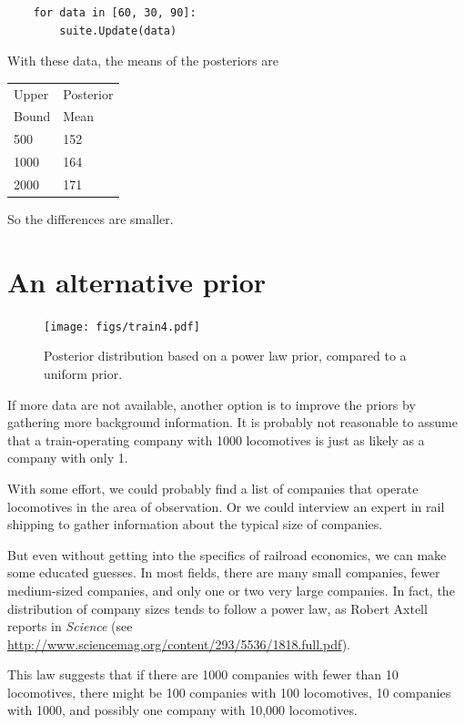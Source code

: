 \documentclass[12pt]{book}
\begin{document}
\begin{verbatim}
    for data in [60, 30, 90]:
        suite.Update(data)
\end{verbatim}

With these data, the means of the posteriors are

  \begin{tabular}{|l|l|}
  \hline
  Upper & Posterior \\
  Bound & Mean \\
  \hline
  500 & 152 \\
  1000 & 164\\
  2000 & 171\\
  \hline
  \end{tabular}

So the differences are smaller.


\section{An alternative prior}

\begin{figure}
\centerline{\texttt{[image: figs/train4.pdf]}}
\caption{Posterior distribution based on a power law prior,
compared to a uniform prior.}
\label{fig.train4}
\end{figure}

If more data are not available, another option is to improve the
priors by gathering more background information.  It is probably
not reasonable to assume that a train-operating company with 1000 locomotives
is just as likely as a company with only 1.

With some effort, we could probably find a list of companies that
operate locomotives in the area of observation.  Or we could
interview an expert in rail shipping to gather information about
the typical size of companies.

But even without getting into the specifics of railroad economics, we
can make some educated guesses.  In most fields, there are many small
companies, fewer medium-sized companies, and only one or two very
large companies.  In fact, the distribution of company sizes tends to
follow a power law, as Robert Axtell reports in {\it Science} (see
\url{http://www.sciencemag.org/content/293/5536/1818.full.pdf}).

This law suggests that if there are 1000 companies with fewer than
10 locomotives, there might be 100 companies with 100 locomotives,
10 companies with 1000, and possibly one company with 10,000 locomotives.
\end{document}
